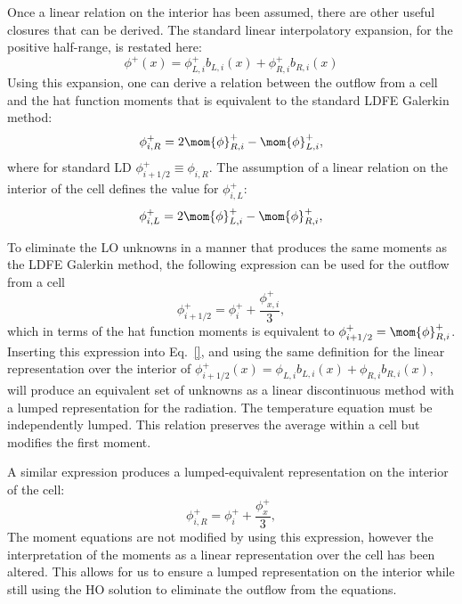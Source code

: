 Once a linear relation on the interior has been assumed, there are other useful closures that can be
derived.  The standard linear interpolatory expansion, for the positive half-range, is restated here:
\begin{equation}
\phi^+(x) = \phi^+_{L,i} b_{L,i}(x) + \phi^+_{R,i} b_{R,i}(x)
\end{equation}
Using this expansion, one can derive a relation between the outflow from a cell and the
hat function moments that is equivalent to the standard LDFE Galerkin method:
\begin{equation}
    \phi_{i,R}^+ = 2 \mom{\phi}_{R,i}^+ - \mom{\phi}_{L,i}^+,
\end{equation}
where for standard LD $\phi_{i+1/2}^+\equiv\phi_{i,R}$.  The assumption of a linear relation on the interior
of the cell defines the value for $\phi_{i,L}^+$:
\begin{equation}
    \phi_{i,L}^+ = 2 \mom{\phi}_{L,i}^+ - \mom{\phi}_{R,i}^+,
\end{equation}

To eliminate the LO unknowns in a manner that produces the same moments as the LDFE
Galerkin method, the
following expression can be used for the outflow from a cell
\begin{equation}
    \phi_{i+1/2}^+ = \phi_i^+ + \frac{\phi_{x,i}^+}{3},
\end{equation}
which in terms of the hat function moments is equivalent to $\phi_{i+1/2}^+ =
\mom{\phi}_{R,i}^+$.  Inserting this expression into Eq.~\eqref{}, and using the same
definition for the linear representation over the interior of $\phi_{i+1/2}^+(x) =
\phi_{L,i} b_{L,i}(x) + \phi_{R,i} b_{R,i}(x)$, will produce an equivalent set of unknowns
as a linear discontinuous method with a lumped representation for the radiation.  The
temperature equation must be independently lumped. This
relation preserves the average within a cell but modifies the first moment.  

A similar expression produces a lumped-equivalent representation on the interior of the cell:
\begin{equation}
    \phi_{i,R}^+ = \phi_i^+ + \frac{\phi_x^+}{3},
\end{equation}
The moment equations are not modified by using this expression, however the interpretation
of the moments as a linear representation over the cell has been altered.  This allows for
us to ensure a lumped representation on the interior while still using the HO solution to
eliminate the outflow from the equations.


